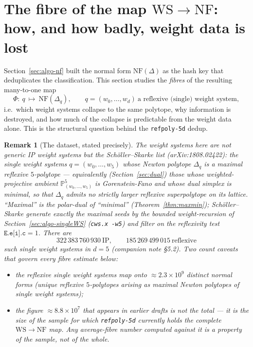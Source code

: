 \documentclass{amsart}
\newtheorem{remark}[theorem]{Remark}
\begin{document}
\section{The fibre of the map $\mathrm{WS}\to\mathrm{NF}$: how, and how
badly, weight data is lost}\label{sec:fibre}

Section~\ref{sec:algo-nf} built the normal form $\mathrm{NF}(\Delta)$ as the
hash key that deduplicates the classification. This section studies the
\emph{fibres} of the resulting many-to-one map
\begin{equation}\label{eq:wsnfmap}
  \Phi:\ q \ \longmapsto\ \mathrm{NF}(\Delta_q),
  \qquad
  q=(w_0,\dots,w_d)\ \text{a reflexive (single) weight system},
\end{equation}
i.e.\ which weight systems collapse to the same polytope, why information is
destroyed, and how much of the collapse is predictable from the weight data
alone. This is the structural question behind the \texttt{refpoly-5d} dedup.

\begin{remark}[The dataset, stated precisely]\label{rmk:datasetnumbers}
The weight systems here are \emph{not} generic IP weight systems but the
Sch\"oller--Skarke list (arXiv:1808.02422): the single weight systems
$q=(w_0,\dots,w_5)$ whose Newton polytope $\Delta_q$ is a \emph{maximal}
reflexive $5$-polytope --- equivalently (Section~\ref{sec:dual}) those whose
weighted-projective ambient $\mathbb P^5_{(w_0,\dots,w_5)}$ is Gorenstein-Fano
and whose dual simplex is \emph{minimal}, so that $\Delta_q$ admits no strictly
larger reflexive superpolytope on its lattice. ``Maximal'' is the polar-dual of
``minimal'' (Theorem~\ref{thm:maxmin}); Sch\"oller--Skarke generate exactly the
maximal seeds by the bounded weight-recursion of Section~\ref{sec:algo-singleWS}
(\texttt{cws.x -w5}) and filter on the reflexivity test $\texttt{E.e[i].c}=1$.
There are
\begin{equation}\label{eq:ssnumbers}
  322\,383\,760\,930 \ \text{IP},
  \qquad
  185\,269\,499\,015 \ \text{reflexive}
\end{equation}
such single weight systems in $d=5$ (companion note \S5.2). Two count caveats
that govern every fibre estimate below:
\begin{itemize}
  \item the reflexive single weight systems map onto $\approx 2.3\times 10^{9}$
        \emph{distinct} normal forms (unique reflexive $5$-polytopes arising as
        maximal Newton polytopes of single weight systems);
  \item the figure $\approx 8.8\times 10^{7}$ that appears in earlier drafts is
        \emph{not} the total --- it is the size of the \emph{sample} for which
        \texttt{refpoly-5d} currently holds the complete $\mathrm{WS}\to
        \mathrm{NF}$ map. Any average-fibre number computed against it is a
        property of the sample, not of the whole.
\end{itemize}
\end{remark}
\end{document}

